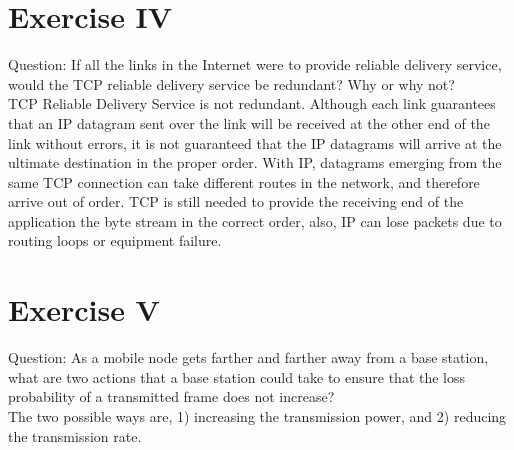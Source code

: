 \documentclass[11pt]{article}
\begin{document}
	\section*{Exercise IV}
	Question: If all the links in the Internet were to provide reliable delivery service, would the TCP reliable delivery service be redundant? Why or why not?\\
	\linebreak
	TCP Reliable Delivery Service is not redundant. Although each link guarantees that an IP datagram sent over the link will be received at the other end of the link without errors, it is not guaranteed that the IP datagrams will arrive at the ultimate destination in the proper order. With IP, datagrams emerging from the same TCP connection can take different routes in the network, and therefore arrive out of order. TCP is still needed to provide the receiving end of the application the byte stream in the correct order, also, IP can lose packets due to routing loops or equipment failure.

	\section*{Exercise V}
	Question:
	As a mobile node gets farther and farther away from a base station, what are two actions that a base station could take to ensure that the loss probability of a transmitted frame does not increase?\\
  \linebreak
	The two possible ways are, 1) increasing the transmission power, and 2) reducing the transmission rate.
\end{document}
